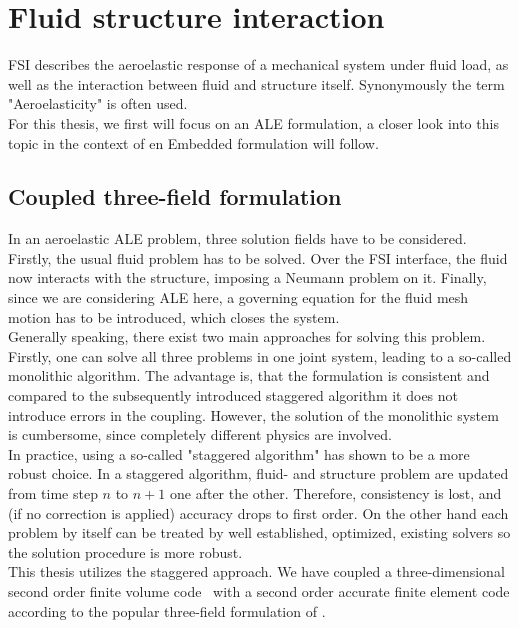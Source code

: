 \documentclass[../main.tex]{subfiles}
\begin{document}
\setlength{\delimitershortfall}{0pt}
\section{Fluid structure interaction}
\acf{FSI} describes the aeroelastic response of a mechanical system under fluid load, as well as the interaction between fluid and structure itself. Synonymously the term "Aeroelasticity" is often used.\\

For this thesis, we first will focus on an \ac{ALE} formulation, a closer look into this topic in the context of en Embedded formulation will follow.\\

\subsection{Coupled three-field formulation}
In an aeroelastic ALE problem, three solution fields have to be considered. Firstly, the usual fluid problem has to be solved. Over the \ac{FSI} interface, the fluid now interacts with the structure, imposing a Neumann problem on it. Finally, since we are considering \ac{ALE} here, a governing equation for the fluid mesh motion has to be introduced, which closes the system.\\
Generally speaking, there exist two main approaches for solving this problem. Firstly, one can solve all three problems in one joint system, leading to a so-called monolithic algorithm. The advantage is, that the formulation is consistent and compared to the subsequently introduced staggered algorithm it does not introduce errors in the coupling. However, the solution of the monolithic system is cumbersome, since completely different physics are involved.\\
In practice, using a so-called "staggered algorithm" has shown to be a more robust choice. In a staggered algorithm, fluid- and structure problem are updated from time step $n$ to $n+1$ one after the other. Therefore, consistency is lost, and (if no correction is applied) accuracy drops to first order. On the other hand each problem by itself can be treated by well established, optimized, existing solvers so the solution procedure is more robust.\\
This thesis utilizes the staggered approach. We have coupled a three-dimensional second order finite volume code~\cite{Aerof} with a second order accurate finite element code\cite{Aeros} according to the popular three-field formulation of \cite{Farhat1995}.\\
\end{document}
